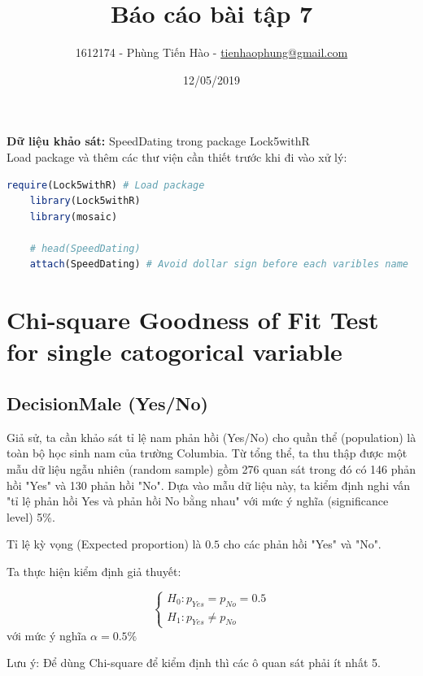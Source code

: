\documentclass[a4paper,12pt]{article}
\title{Báo cáo bài tập 7}
\author{1612174 - Phùng Tiến Hào - \href{mailto:tienhaophung@gmail.com}{tienhaophung@gmail.com}}
\date{12/05/2019}
\begin{document}
	\maketitle
	\newpage
	
	\doublespacing
	\tableofcontents
	\singlespace
	
	\newpage
	
	\textbf{Dữ liệu khảo sát:} SpeedDating trong package Lock5withR\\
	
	Load package và thêm các thư viện cần thiết trước khi đi vào xử lý:
	\begin{lstlisting}[language=R]
	require(Lock5withR) # Load package
	library(Lock5withR)
	library(mosaic)
	
	# head(SpeedDating)
	attach(SpeedDating) # Avoid dollar sign before each varibles name
	\end{lstlisting}
	
	\section{Chi-square Goodness of Fit Test for single catogorical variable}
	\subsection{DecisionMale (Yes/No)}
	
	Giả sử, ta cần khảo sát tỉ lệ nam phản hồi (Yes/No) cho quần thể (population) là toàn bộ học sinh nam của trường Columbia. Từ tổng thể, ta thu thập được một mẫu dữ liệu ngẫu nhiên (random sample) gồm 276 quan sát trong đó có 146 phản hồi "Yes" và 130 phản hồi "No". Dựa vào mẫu dữ liệu này, ta kiểm định nghi vấn "tỉ lệ phản hồi Yes và phản hồi No bằng nhau" với mức ý nghĩa (significance level) 5\%.
	
	Tỉ lệ kỳ vọng (Expected proportion) là $0.5$ cho các phản hồi "Yes" và "No".
	
	Ta thực hiện kiểm định giả thuyết:
	
	\begin{equation*}
		\begin{cases}
		H_0: p_{Yes} = p_{No} = 0.5\\
		H_1: p_{Yes} \neq p_{No}
		\end{cases}
	\end{equation*}
	với mức ý nghĩa $\alpha = 0.5\%$
	
	Lưu ý: Để dùng Chi-square để kiểm định thì các ô quan sát phải ít nhất 5.
	
\end{document}
